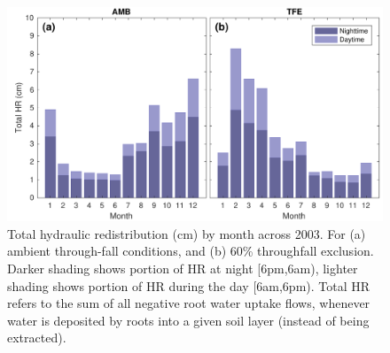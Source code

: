 \documentclass[draft,linenumbers]{agujournal}
\begin{document}
  


             
    \clearpage
    \begin{figure}[h]
     \centering
     \includegraphics[width=30pc]{../figs3/hr.pdf}
     \caption{Total hydraulic redistribution (cm) by month across 2003. For (a) ambient through-fall conditions, and (b) 60\% throughfall exclusion. 
     Darker shading shows portion of HR at night [6pm,6am), lighter shading shows portion of HR during the day [6am,6pm).
     Total HR refers to the sum of all negative root water uptake flows, whenever water is deposited by roots into a given soil layer (instead of being extracted).}
     \label{fig:hr}
  \end{figure}

  



  
\end{document}
